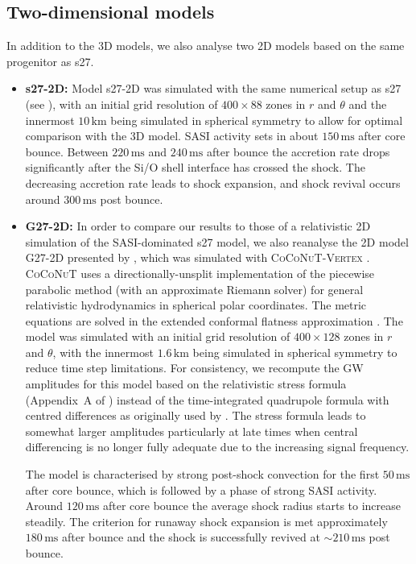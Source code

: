 \subsection{Two-dimensional models}
{In addition to the 3D models, we also analyse two 2D models based on the same progenitor
as s27. 
\begin{itemize}
\item \textbf{s27-2D:} Model s27-2D was simulated with the same numerical setup as s27 (see \citealp{hanke_13}),
with an initial grid resolution of $400 \times 88$ zones in $r$ and $\theta$ and the 
innermost $10 \, \mathrm{km}$ being simulated in spherical symmetry to allow for
optimal comparison with the 3D model.
SASI activity sets in about $150 \, \mathrm{ms}$ after
core bounce. Between $220 \, \mathrm{ms}$ and $240 \, \mathrm{ms}$ after bounce the accretion rate drops significantly
after the Si/O shell interface has crossed the shock.
The decreasing accretion rate leads to shock expansion, and
shock revival occurs around $300 \, \mathrm{ms}$ post bounce.
\end{itemize}
\begin{itemize}
\item \textbf{G27-2D:} In order to compare our results to those of a 
relativistic 2D simulation of the SASI-dominated s27 model, 
we also reanalyse the 2D model G27-2D presented
by \cite{mueller_13}, which was simulated with \textsc{CoCoNuT-Vertex} \citep{mueller_10}. 
\textsc{CoCoNuT} \citep{dimmelmeier_02_a,dimmelmeier_04} uses a
directionally-unsplit implementation of the piecewise parabolic
method (with an approximate Riemann solver) for general relativistic hydrodynamics in spherical polar coordinates. 
The metric equations are solved in the extended conformal flatness approximation \citep{cordero_09}. 
The model was simulated with an initial grid resolution of $400 \times 128$ zones in $r$ and $\theta$, 
with the innermost $1.6 \, \mathrm{km}$ being simulated in spherical symmetry to reduce time step limitations.
For consistency, we recompute the GW amplitudes for this model based on the relativistic stress formula 
(Appendix~A of \citealp{mueller_13}) instead of the time-integrated quadrupole formula with centred differences as originally used by \cite{mueller_13}. 
The stress formula leads to somewhat larger amplitudes particularly at late times when central differencing
is no longer fully adequate due to the increasing signal frequency.

The model is characterised by strong post-shock convection for the first $50 \, \mathrm{ms}$
after core bounce, which is followed by a phase of
strong SASI activity. Around $120 \, \mathrm{ms}$ after core bounce the average
shock radius starts to increase steadily. The criterion for runaway shock expansion is met
approximately $180 \, \mathrm{ms}$ after bounce and 
the shock is successfully revived at $\mathord{\sim 210} \, \mathrm{ms}$ post bounce.


\end{itemize}}
